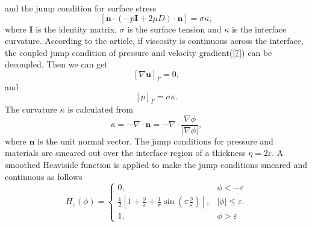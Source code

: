 and the jump condition for surface stress
\begin{equation}\label{7}
  [\mathbf{n}\cdot(-p\mathbf{I}+2\mu{D})\cdot\mathbf{n}]=\sigma\kappa,
\end{equation}
where $\mathbf{I}$ is the identity matrix, $\sigma$ is the surface tension and $\kappa$ is the interface curvature. According to the article\cite{van2008computing}, if viscosity is continuous across the interface, the coupled jump condition of pressure and velocity gradient(\ref{7}) can be decoupled. Then we can get
\begin{equation}\label{14}
[\nabla\mathbf{u}]_\Gamma = 0,
\end{equation}
and
\begin{equation}\label{15}
[p]_\Gamma=\sigma\kappa.
\end{equation}
The curvature $\kappa$ is calculated from
\begin{equation}\label{9}
\kappa=-\nabla\cdot\mathbf{n}=-\nabla\cdot\frac{\nabla\phi}{\left|\nabla\phi\right|},
\end{equation}
where $\mathbf{n}$ is the unit normal vector.
The jump conditions for pressure and materials are smeared out over the interface region of a thickness $\eta=2\varepsilon$. A smoothed Heaviside function is applied to make the jump conditions smeared and continuous as follows
\begin{equation}\label{8}
H_\varepsilon(\phi)=
\left\{
\begin{array}{ll}
0, & {\phi<-\varepsilon} \\
\frac{1}{2}[1+\frac{\phi}{\varepsilon}+\frac{1}{\pi}\sin{(\pi\frac{\phi}{\varepsilon})}],& {\left|\phi\right|\le{\varepsilon}}.\\
1, & {\phi>\varepsilon}
\end{array}\right.
\end{equation}


